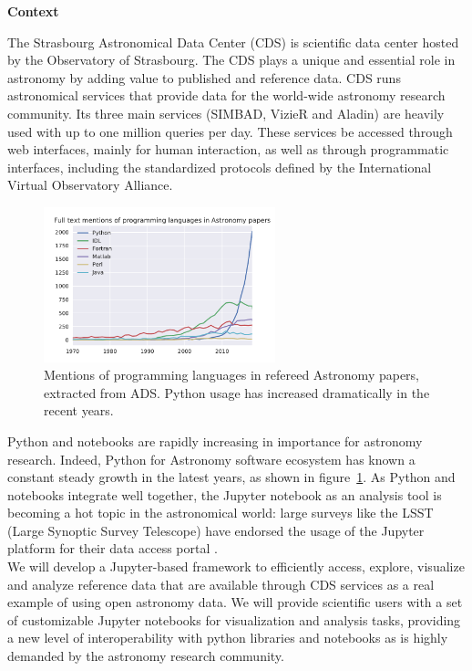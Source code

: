 \begin{task}[
  title=Astronomy application,
  id=astro,
  lead=CDS,
  PM=18,
  wphases={18-42},
  partners={QS,WTT,SRL,INSERM,XFEL}
]

\textbf{Context}

  The Strasbourg Astronomical Data Center (CDS) is scientific data
  center hosted by the Observatory of Strasbourg. The CDS plays a unique and
  essential role in astronomy by adding value to published and reference data.
  CDS runs astronomical services that
  provide data for the world-wide astronomy research community. Its three main
  services (SIMBAD, VizieR and Aladin) are heavily used with up to one million
  queries per day.  These services be accessed through web interfaces, mainly
  for human interaction, as well as through programmatic interfaces, including
  the standardized protocols defined by the International Virtual Observatory
  Alliance.

\begin{figure}[ht!]\centering
  \includegraphics[width=0.6\textwidth]{python-astro-citations}
  \caption{Mentions of programming languages in refereed Astronomy papers, extracted from ADS. Python usage has increased dramatically in the recent years.}\label{fig:python-astro-citations}
\end{figure}

  Python and notebooks are rapidly increasing in importance for astronomy 
  research. Indeed, Python for Astronomy software ecosystem has known a 
  constant steady growth in the latest years, as shown in 
  figure~\ref{fig:python-astro-citations}. As Python and notebooks integrate 
  well together, the Jupyter notebook as an analysis tool is becoming a hot 
  topic in the astronomical world: large surveys like the LSST (Large Synoptic
  Survey Telescope) have endorsed the usage of the Jupyter platform for their 
    data access portal \cite{lsst2017scienceplatform}.\\


  We will develop a Jupyter-based framework to efficiently access, explore,
  visualize and analyze reference data that are available through CDS services 
  as a real example of using open astronomy data.
  We will provide scientific users with a set of customizable Jupyter notebooks
  for visualization and analysis tasks, providing a new level of
  interoperability with python libraries and notebooks as is highly demanded
  by the astronomy research community.


\end{task}
